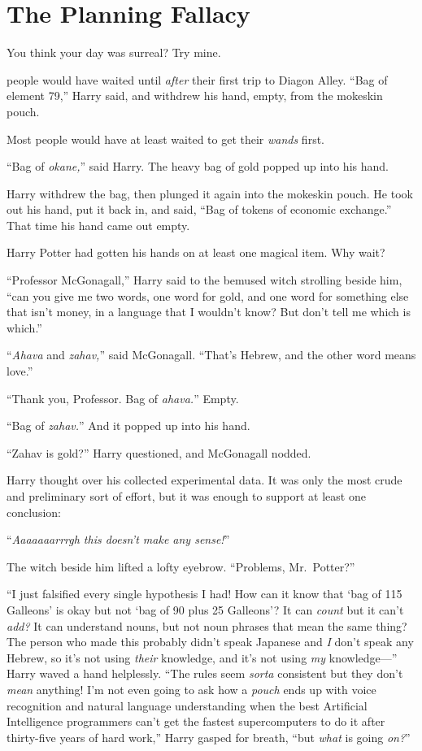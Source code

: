 \chapter{The Planning Fallacy}

\epigraph{You think your day was surreal? Try mine.}{}

 people would have waited until \emph{after} their first trip to Diagon Alley.
“Bag of element 79,” Harry said, and withdrew his hand, empty, from the mokeskin pouch.

Most people would have at least waited to get their \emph{wands} first.

“Bag of \emph{okane,}” said Harry. The heavy bag of gold popped up into his hand.

Harry withdrew the bag, then plunged it again into the mokeskin pouch. He took out his hand, put it back in, and said, “Bag of tokens of economic exchange.” That time his hand came out empty.

Harry Potter had gotten his hands on at least one magical item. Why wait?

“Professor McGonagall,” Harry said to the bemused witch strolling beside him, “can you give me two words, one word for gold, and one word for something else that isn’t money, in a language that I wouldn’t know? But don’t tell me which is which.”

“\emph{Ahava} and \emph{zahav,}” said McGonagall. “That’s Hebrew, and the other word means love.”

“Thank you, Professor. Bag of \emph{ahava.}” Empty.

“Bag of \emph{zahav.}” And it popped up into his hand.

“Zahav is gold?” Harry questioned, and McGonagall nodded.

Harry thought over his collected experimental data. It was only the most crude and preliminary sort of effort, but it was enough to support at least one conclusion:

“\emph{Aaaaaaarrrgh this doesn’t make any sense!}”

The witch beside him lifted a lofty eyebrow. “Problems, Mr.~Potter?”

“I just falsified every single hypothesis I had! How can it know that ‘bag of 115 Galleons’ is okay but not ‘bag of 90 plus 25 Galleons’? It can \emph{count} but it can’t \emph{add?} It can understand nouns, but not noun phrases that mean the same thing? The person who made this probably didn’t speak Japanese and \emph{I} don’t speak any Hebrew, so it’s not using \emph{their} knowledge, and it’s not using \emph{my} knowledge—” Harry waved a hand helplessly. “The rules seem \emph{sorta} consistent but they don’t \emph{mean} anything! I’m not even going to ask how a \emph{pouch} ends up with voice recognition and natural language understanding when the best Artificial Intelligence programmers can’t get the fastest supercomputers to do it after thirty-five years of hard work,” Harry gasped for breath, “but \emph{what} is going \emph{on?}”

